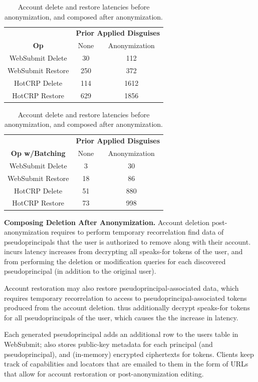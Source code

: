 \begin{table}[t!]
\begin{center}
\begin{tabular}{ c | c c }
& \multicolumn{2}{c}{\textbf{Prior Applied Disguises}} \\
    \textbf{Op} & None & Anonymization \\
\hline
WebSubmit Delete & 30 & 112 \\
WebSubmit Restore & 250 & 372\\
HotCRP Delete & 114 & 1612 \\
HotCRP Restore & 629 & 1856 \\
\end{tabular}
\quad
\begin{tabular}{ c | c c }
 & \multicolumn{2}{c}{\textbf{Prior Applied Disguises}} \\
    \textbf{Op w/Batching} & None & Anonymization \\
\hline
WebSubmit Delete  & 3 & 30 \\
WebSubmit Restore  & 18 & 86\\
HotCRP Delete  & 51 & 880 \\
HotCRP Restore  & 73 & 998 
\end{tabular}
\end{center}
\caption{Account delete and restore latencies before anonymization, and composed after anonymization.}
\label{tab:composition}
\end{table}

\textbf{Composing Deletion After Anonymization.}
Account deletion post-anonymization requires \sys to perform temporary
recorrelation find data of pseudoprincipals that the user is authorized to remove along with their
account. \sys incurs latency increases from decrypting all speaks-for tokens of the user, and from
performing the deletion or modification queries for each discovered pseudoprincipal (in addition to
the original user).

Account restoration may also restore pseudoprincipal-associated data, which requires temporary recorrelation
to access to pseudoprincipal-associated tokens produced from the account deletion.  \sys thus
additionally decrypt speaks-for tokens for all pseudoprincipals of the user, which causes the the
increase in latency.


Each generated pseudoprincipal adds an additional row to the users table in WebSubmit; \sys also
stores public-key metadata for each principal (and pseudoprincipal), and (in-memory) encrypted
ciphertexts for tokens.  Clients keep track of capabilities and locators that are emailed to them in
the form of URLs that allow for account restoration or post-anonymization editing.

